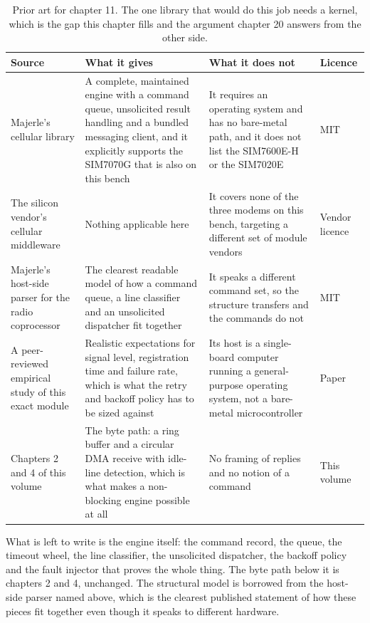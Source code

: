 \begin{table}[H]\centering\small
\begin{tabular}{p{34mm}p{46mm}p{38mm}p{20mm}}
\toprule
Source & What it gives & What it does not & Licence \\
\midrule
Majerle's cellular library & A complete, maintained engine with a command queue, unsolicited result handling and a bundled messaging client, and it explicitly supports the SIM7070G that is also on this bench & It requires an operating system and has no bare-metal path, and it does not list the SIM7600E-H or the SIM7020E & MIT \\
The silicon vendor's cellular middleware & Nothing applicable here & It covers none of the three modems on this bench, targeting a different set of module vendors & Vendor licence \\
Majerle's host-side parser for the radio coprocessor & The clearest readable model of how a command queue, a line classifier and an unsolicited dispatcher fit together & It speaks a different command set, so the structure transfers and the commands do not & MIT \\
A peer-reviewed empirical study of this exact module & Realistic expectations for signal level, registration time and failure rate, which is what the retry and backoff policy has to be sized against & Its host is a single-board computer running a general-purpose operating system, not a bare-metal microcontroller & Paper \\
Chapters 2 and 4 of this volume & The byte path: a ring buffer and a circular DMA receive with idle-line detection, which is what makes a non-blocking engine possible at all & No framing of replies and no notion of a command & This volume \\
\bottomrule
\end{tabular}
\caption{Prior art for chapter 11. The one library that would do this job needs a kernel, which is the gap this chapter fills and the argument chapter 20 answers from the other side.}
\end{table}

What is left to write is the engine itself: the command record, the queue, the
timeout wheel, the line classifier, the unsolicited dispatcher, the backoff
policy and the fault injector that proves the whole thing. The byte path below
it is chapters 2 and 4, unchanged. The structural model is borrowed from the
host-side parser named above, which is the clearest published statement of how
these pieces fit together even though it speaks to different hardware.


